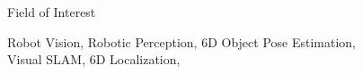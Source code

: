 \begin{rSection}{Field of Interest}
\item Robot Vision, Robotic Perception, 6D Object Pose Estimation, \\ Visual \acf{SLAM}, 6D Localization,
\end{rSection}

